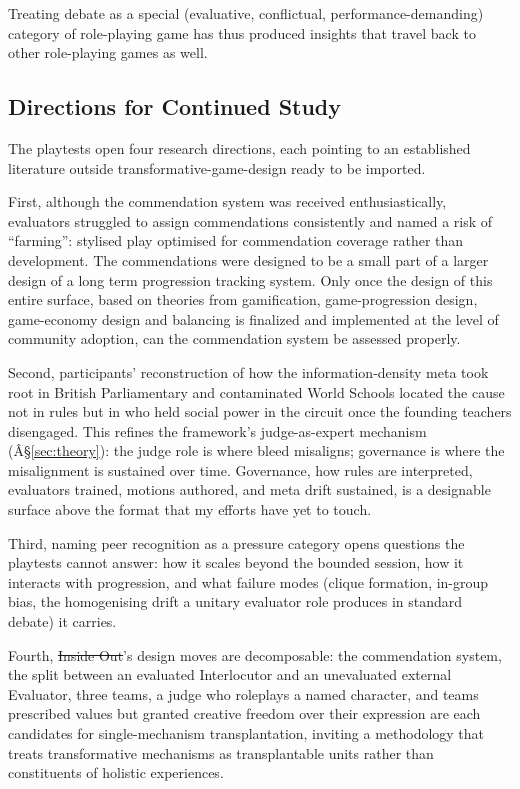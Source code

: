 \documentclass[12pt]{article}
\makeatletter
\providecommand{\DIFaddtex}[1]{{\protect\color[rgb]{0,0.5,0}\uwave{#1}}} %
\providecommand{\DIFdeltex}[1]{{\protect\color{red}\sout{#1}}} %
\providecommand{\DIFaddbegin}{} %
\providecommand{\DIFaddend}{} %
\providecommand{\DIFdelbegin}{} %
\providecommand{\DIFdelend}{} %
\providecommand{\DIFadd}[1]{\texorpdfstring{\DIFaddtex{#1}}{#1}} %
\providecommand{\DIFdel}[1]{\texorpdfstring{\DIFdeltex{#1}}{}} %
\providecommand{\DIFscaledelfig}{0.5}
\newlength{\DIFdelgraphicswidth} %
\newlength{\DIFdelgraphicsheight} %
\providecommand{\DIFaddincludegraphics}[2][]{{\color[rgb]{0,0.5,0}\fbox{\DIFOincludegraphics[#1]{#2}}}} %
\providecommand{\DIFdelincludegraphics}[2][]{%
\sbox{\DIFdelgraphicsbox}{\DIFOincludegraphics[#1]{#2}}%
\settoboxwidth{\DIFdelgraphicswidth}{\DIFdelgraphicsbox} %
\settoboxtotalheight{\DIFdelgraphicsheight}{\DIFdelgraphicsbox} %
\scalebox{\DIFscaledelfig}{%
\parbox[b]{\DIFdelgraphicswidth}{\usebox{\DIFdelgraphicsbox}\\[-\baselineskip] \rule{\DIFdelgraphicswidth}{0em}}\llap{\resizebox{\DIFdelgraphicswidth}{\DIFdelgraphicsheight}{%
\setlength{\unitlength}{\DIFdelgraphicswidth}%
\begin{picture}(1,1)%
\thicklines\linethickness{2pt} %
{\color[rgb]{1,0,0}\put(0,0){\framebox(1,1){}}}%
{\color[rgb]{1,0,0}\put(0,0){\line( 1,1){1}}}%
{\color[rgb]{1,0,0}\put(0,1){\line(1,-1){1}}}%
\end{picture}%
}\hspace*{3pt}}} %
} %
\DeclareRobustCommand{\DIFaddbegin}{\DIFOaddbegin \let\includegraphics\DIFaddincludegraphics} %
\DeclareRobustCommand{\DIFaddend}{\DIFOaddend \let\includegraphics\DIFOincludegraphics} %
\DeclareRobustCommand{\DIFdelbegin}{\DIFOdelbegin \let\includegraphics\DIFdelincludegraphics} %
\DeclareRobustCommand{\DIFdelend}{\DIFOaddend \let\includegraphics\DIFOincludegraphics} %
\let\sout@orig\sout %
\renewcommand{\sout}[1]{\ifmmode\text{\sout@orig{\ensuremath{#1}}}\else\sout@orig{#1}\fi} %
\makeatother
\begin{document}
\DIFaddend Treating debate as a special (evaluative, conflictual, performance-demanding) category of role-playing game has thus produced insights that travel back to other role-playing games as well.

\subsection{Directions for Continued Study}
\label{sec:further-study}

The playtests open four research directions, each pointing to an established literature outside transformative-game-design ready to be imported.

First, although the commendation system was received enthusiastically, evaluators struggled to assign commendations consistently and named a risk of ``farming'': stylised play optimised for commendation coverage rather than development. The commendations were designed to be a small part of a larger design of a long term progression tracking system. Only once the design of this entire surface, based on theories from gamification, game-progression design, game-economy design and balancing is finalized and implemented at the level of community adoption, can the commendation system be assessed properly.

Second, participants' reconstruction of how the information-density meta took root in British Parliamentary and contaminated World Schools located the cause not in rules but in who held social power in the circuit once the founding teachers disengaged. This refines the framework's judge-as-expert mechanism (Â§\ref{sec:theory}): the judge role is where bleed misaligns; governance is where the misalignment is sustained over time. Governance, how rules are interpreted, evaluators trained, motions authored, and meta drift sustained, is a designable surface above the format that my efforts have yet to touch. 

Third, naming peer recognition as a pressure category opens questions the playtests cannot answer: how it scales beyond the bounded session, how it interacts with progression, and what failure modes (clique formation, in-group bias, the homogenising drift a unitary evaluator role produces in standard debate) it carries.

Fourth, \DIFdelbegin \DIFdel{Inside Out}\DIFdelend \DIFaddbegin \emph{\DIFadd{Inside Out}}\DIFaddend 's design moves are decomposable: the commendation system, the split between an evaluated Interlocutor and an unevaluated external Evaluator, three teams, a judge who roleplays a named character, and teams prescribed values but granted creative freedom over their expression are each candidates for single-mechanism transplantation, inviting a methodology that treats transformative mechanisms as transplantable units rather than constituents of holistic experiences.
\end{document}
